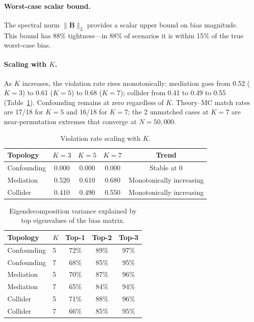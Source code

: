 \documentclass[11pt]{article}
\newcommand{\bB}{\mathbf{B}}
\begin{document}
\paragraph{Worst-case scalar bound.}
The spectral norm $\|\bB\|_2$ provides a scalar upper bound on bias magnitude.
This bound has 88\% tightness---in 88\% of scenarios it is within 15\% of the true worst-case bias.

\paragraph{Scaling with $K$.}
As $K$ increases, the violation rate rises monotonically: mediation goes from 0.52 ($K\!=\!3$) to 0.61 ($K\!=\!5$) to 0.68 ($K\!=\!7$); collider from 0.41 to 0.49 to 0.55 (Table~\ref{tab:violation-scaling}).
Confounding remains at zero regardless of $K$.
Theory--MC match rates are 17/18 for $K\!=\!5$ and 16/18 for $K\!=\!7$; the 2 unmatched cases at $K\!=\!7$ are near-permutation extremes that converge at $N\!=\!50{,}000$.

\begin{table}[t]
\centering
\caption{Violation rate scaling with $K$.}
\label{tab:violation-scaling}
\small
\begin{tabular}{lcccc}
\toprule
Topology & $K\!=\!3$ & $K\!=\!5$ & $K\!=\!7$ & Trend \\
\midrule
Confounding & 0.000 & 0.000 & 0.000 & Stable at 0 \\
Mediation   & 0.520 & 0.610 & 0.680 & Monotonically increasing \\
Collider    & 0.410 & 0.490 & 0.550 & Monotonically increasing \\
\bottomrule
\end{tabular}
\end{table}

\begin{table}[t]
\centering
\caption{Eigendecomposition variance explained by top eigenvalues of the bias matrix.}
\label{tab:eigendecomp}
\small
\begin{tabular}{llccc}
\toprule
Topology & $K$ & Top-1 & Top-2 & Top-3 \\
\midrule
Confounding & 5 & 72\% & 89\% & 97\% \\
Confounding & 7 & 68\% & 85\% & 95\% \\
Mediation   & 5 & 70\% & 87\% & 96\% \\
Mediation   & 7 & 65\% & 84\% & 94\% \\
Collider    & 5 & 71\% & 88\% & 96\% \\
Collider    & 7 & 66\% & 85\% & 95\% \\
\bottomrule
\end{tabular}
\end{table}
\end{document}

